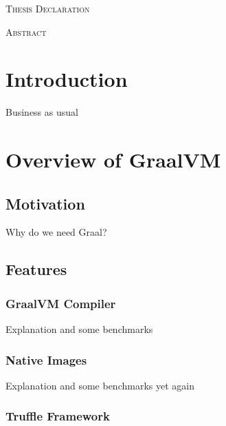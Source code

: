 \documentclass[12pt]{article}
\begin{document}
\setcounter{page}{1}

\thispagestyle{empty}

\begin{center}
\Large
\textsc{Thesis Declaration}
\end{center}

\pagebreak

\thispagestyle{empty}

\begin{center}
\Large
\textsc{Abstract}
\end{center}

\pagebreak

\tableofcontents
\pagebreak
{}

\section{Introduction}
\label{sec:org5092def}

Business as usual

\section{Overview of GraalVM}
\label{sec:org578902f}

\subsection{Motivation}
\label{sec:orga63bf96}

Why do we need Graal?

\subsection{Features}
\label{sec:org176a276}

\subsubsection{GraalVM Compiler}
\label{sec:org3f9038e}

Explanation and some benchmarks

\subsubsection{Native Images}
\label{sec:orge4a0fa8}

Explanation and some benchmarks yet again

\subsubsection{Truffle Framework}
\label{sec:org564edb4}
\end{document}
